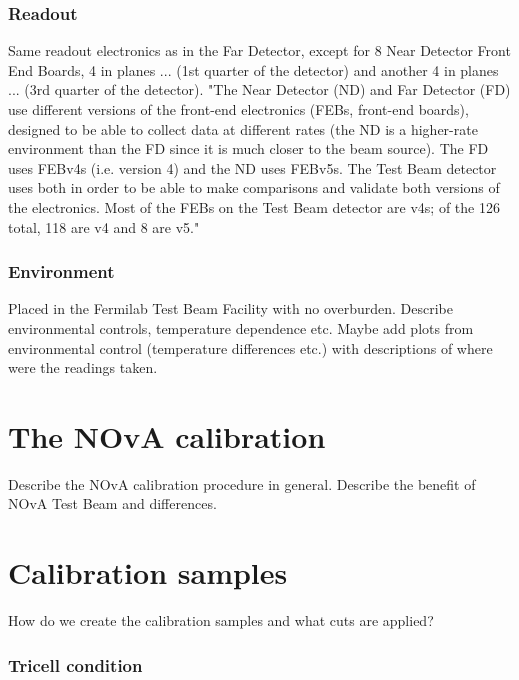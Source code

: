 \documentclass[12pt,a4paper]{article}
\begin{document}
\subsubsection*{Readout}
Same readout electronics as in the Far Detector, except for 8 Near Detector Front End Boards, 4 in planes ... (1st quarter of the detector) and another 4 in planes ... (3rd quarter of the detector).
"The Near Detector (ND) and Far Detector (FD) use different versions of the front-end electronics (FEBs, front-end boards), designed to be able to collect data at different rates (the ND is a higher-rate environment than the FD since it is much closer to the beam source). The FD uses FEBv4s (i.e. version 4) and the ND uses FEBv5s. The Test Beam detector uses both in order to be able to make comparisons and validate both versions of the electronics. Most of the FEBs on the Test Beam detector are v4s; of the 126 total, 118 are v4 and 8 are v5."%

\subsubsection*{Environment}
Placed in the Fermilab Test Beam Facility with no overburden. Describe environmental controls, temperature dependence etc. Maybe add plots from environmental control (temperature differences etc.) with descriptions of where were the readings taken.


\section{The NOvA calibration}
Describe the NOvA calibration procedure in general. Describe the benefit of NOvA Test Beam and differences.

\section{Calibration samples}
How do we create the calibration samples and what cuts are applied?

\subsubsection*{Tricell condition}
\end{document}
